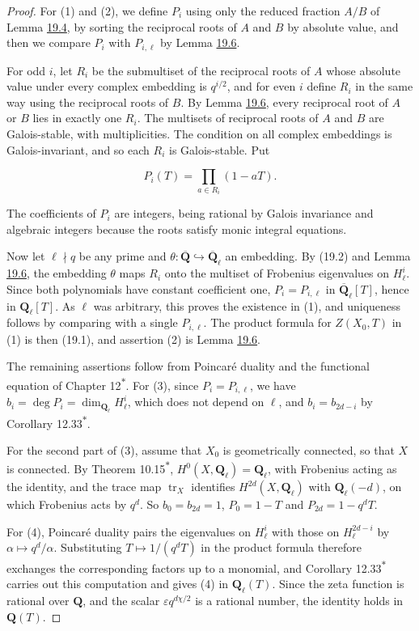 \documentclass[11pt]{article}
\newcommand{\bpout}[1]{#1\textsuperscript{\hyperlink{bp-outside}{\ensuremath{\ast}}}}
\begin{document}
\begin{proof}[{Proof}]\label{bp343}%
For (1) and (2), we define \(P_i\) using only the reduced fraction \(A/B\) of Lemma \hyperref[bp333]{19.4}, by sorting the reciprocal roots of \(A\) and \(B\) by absolute value, and then we compare \(P_i\) with \(P_{i,\ell}\) by Lemma \hyperref[bp340]{19.6}.

For odd \(i\), let \(R_i\) be the submultiset of the reciprocal roots of \(A\) whose absolute value under every complex embedding is \(q^{i/2}\), and for even \(i\) define \(R_i\) in the same way using the reciprocal roots of \(B\). By Lemma \hyperref[bp340]{19.6}, every reciprocal root of \(A\) or \(B\) lies in exactly one \(R_i\). The multisets of reciprocal roots of \(A\) and \(B\) are Galois-stable, with multiplicities. The condition on all complex embeddings is Galois-invariant, and so each \(R_i\) is Galois-stable. Put

\[
P_i(T)=\prod_{a\in R_i}(1-aT).
\]

The coefficients of \(P_i\) are integers, being rational by Galois invariance and algebraic integers because the roots satisfy monic integral equations.

Now let \(\ell\nmid q\) be any prime and \(\theta:\overline{\mathbf Q}\hookrightarrow\overline{\mathbf Q}_\ell\) an embedding. By (19.2) and Lemma \hyperref[bp340]{19.6}, the embedding \(\theta\) maps \(R_i\) onto the multiset of Frobenius eigenvalues on \(H^i_\ell\). Since both polynomials have constant coefficient one, \(P_i=P_{i,\ell}\) in \(\overline{\mathbf Q}_\ell[T]\), hence in \(\mathbf Q_\ell[T]\). As \(\ell\) was arbitrary, this proves the existence in (1), and uniqueness follows by comparing with a single \(P_{i,\ell}\). The product formula for \(Z(X_0,T)\) in (1) is then (19.1), and assertion (2) is Lemma \hyperref[bp340]{19.6}.

The remaining assertions follow from Poincaré duality and the functional equation of Chapter \bpout{12}. For (3), since \(P_i=P_{i,\ell}\), we have \(b_i=\deg P_i=\dim_{\mathbf Q_\ell}H^i_\ell\), which does not depend on \(\ell\), and \(b_i=b_{2d-i}\) by Corollary \bpout{12.33}.

For the second part of (3), assume that \(X_0\) is geometrically connected, so that \(X\) is connected. By Theorem \bpout{10.15}, \(H^0(X,\mathbf Q_\ell)=\mathbf Q_\ell\), with Frobenius acting as the identity, and the trace map \(\operatorname{tr}_X\) identifies \(H^{2d}(X,\mathbf Q_\ell)\) with \(\mathbf Q_\ell(-d)\), on which Frobenius acts by \(q^d\). So \(b_0=b_{2d}=1\), \(P_0=1-T\) and \(P_{2d}=1-q^dT\).

For (4), Poincaré duality pairs the eigenvalues on \(H^i_\ell\) with those on \(H^{2d-i}_\ell\) by \(\alpha\mapsto q^d/\alpha\). Substituting \(T\mapsto1/(q^dT)\) in the product formula therefore exchanges the corresponding factors up to a monomial, and Corollary \bpout{12.33} carries out this computation and gives (4) in \(\mathbf Q_\ell(T)\). Since the zeta function is rational over \(\mathbf Q\), and the scalar \(\varepsilon q^{d\chi/2}\) is a rational number, the identity holds in \(\mathbf Q(T)\).
\end{proof}
\end{document}

